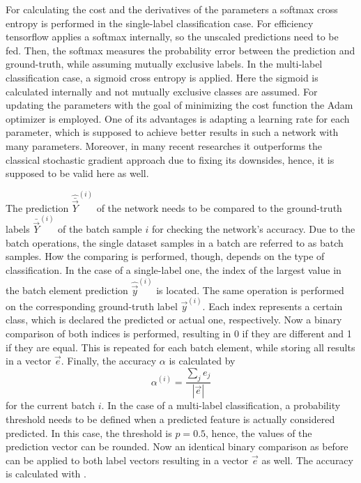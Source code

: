 For calculating the cost and the derivatives of the parameters a softmax cross entropy is performed in the single-label classification case.
For efficiency tensorflow applies a softmax internally, so the unscaled predictions need to be fed.
Then, the softmax measures the probability error between the prediction and ground-truth, while assuming mutually exclusive labels.
In the multi-label classification case, a sigmoid cross entropy is applied.
Here the sigmoid is calculated internally and not mutually exclusive classes are assumed.
For updating the parameters with the goal of minimizing the cost function the Adam optimizer is employed.
One of its advantages is adapting a learning rate for each parameter, which is supposed to achieve better results in such a network with many parameters.
Moreover, in many recent researches it outperforms the classical stochastic gradient approach due to fixing its downsides, hence, it is supposed to be valid here as well.

The prediction $\hat{\bar{\vec{Y}}}^{(i)}$ of the network needs to be compared to the ground-truth labels $\bar{\vec{Y}}^{(i)}$ of the batch sample $i$ for checking the network's accuracy.
Due to the batch operations, the single dataset samples in a batch are referred to as batch samples.
How the comparing is performed, though, depends on the type of classification.
In the case of a single-label one, the index of the largest value in the batch element prediction $\hat{\vec{y}}^{(i)}$ is located.
The same operation is performed on the corresponding ground-truth label $\vec{y}^{(i)}$.
Each index represents a certain class, which is declared the predicted or actual one, respectively.
Now a binary comparison of both indices is performed, resulting in 0 if they are different and 1 if they are equal.
This is repeated for each batch element, while storing all results in a vector $\vec{e}$.
Finally, the accuracy $\alpha$ is calculated by
\begin{equation}
	\label{eq:accuracy-mean}
	\alpha^{(i)} = \frac{\sum_{j} e_j}{|\vec{e}|}
\end{equation}
for the current batch $i$.
In the case of a multi-label classification, a probability threshold needs to be defined when a predicted feature is actually considered predicted.
In this case, the threshold is $p=0.5$, hence, the values of the prediction vector can be rounded.
Now an identical binary comparison as before can be applied to both label vectors resulting in a vector $\vec{e}$ as well.
The accuracy is calculated with .

